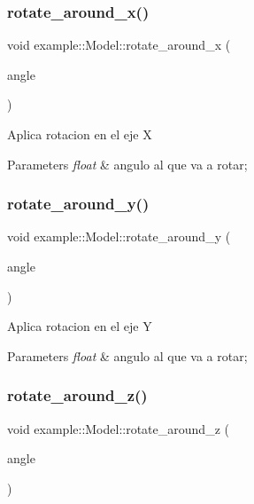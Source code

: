 \mbox{\label{classexample_1_1_model_ae24b7da5abe7cf8bf5f651a307253446}} 
\subsubsection{rotate\_around\_x()}
{\footnotesize\ttfamily void example\+::\+Model\+::rotate\+\_\+around\+\_\+x (\begin{DoxyParamCaption}\item[{float}]{angle }\end{DoxyParamCaption})\hspace{0.3cm}{\ttfamily [inline]}}

Aplica rotacion en el eje X 
\begin{DoxyParams}{Parameters}
{\em float} & angulo al que va a rotar; \\
\hline
\end{DoxyParams}
\mbox{\label{classexample_1_1_model_a34b9a4fe40961a5aaaf0a508c0fbcf86}} 
\subsubsection{rotate\_around\_y()}
{\footnotesize\ttfamily void example\+::\+Model\+::rotate\+\_\+around\+\_\+y (\begin{DoxyParamCaption}\item[{float}]{angle }\end{DoxyParamCaption})\hspace{0.3cm}{\ttfamily [inline]}}

Aplica rotacion en el eje Y 
\begin{DoxyParams}{Parameters}
{\em float} & angulo al que va a rotar; \\
\hline
\end{DoxyParams}
\mbox{\label{classexample_1_1_model_a5fa0b7b46f0e83b9a9a8bf1622c0b5fd}} 
\subsubsection{rotate\_around\_z()}
{\footnotesize\ttfamily void example\+::\+Model\+::rotate\+\_\+around\+\_\+z (\begin{DoxyParamCaption}\item[{float}]{angle }\end{DoxyParamCaption})\hspace{0.3cm}{\ttfamily [inline]}}

